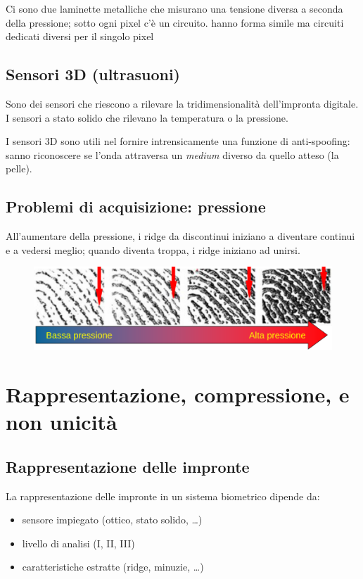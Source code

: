 \noindent Ci sono due laminette metalliche che misurano una tensione diversa a seconda
della pressione; sotto ogni pixel c'è un circuito.
hanno forma simile ma circuiti dedicati diversi per il singolo pixel

\subsection{Sensori 3D (ultrasuoni)}

Sono dei sensori che riescono a rilevare la tridimensionalità dell'impronta digitale.
I sensori a stato solido che rilevano la temperatura o la pressione.

\noindent I sensori 3D sono utili nel fornire intrensicamente una funzione di anti-spoofing: 
sanno riconoscere se l'onda attraversa un \textit{medium} diverso da quello atteso (la pelle).

\subsection{Problemi di acquisizione: pressione}

All'aumentare della pressione, i ridge da discontinui iniziano a diventare continui e a vedersi
meglio; quando diventa troppa, i ridge iniziano ad unirsi.
\begin{figure}[ht]
    \centering
    \includegraphics[width=0.75\linewidth]{chapters/images-chap5/pressione.png}
\end{figure}

\section{Rappresentazione, compressione,  e non unicità}

\subsection{Rappresentazione delle impronte}

La rappresentazione delle impronte in un sistema biometrico dipende da:
\begin{itemize}
    \item sensore impiegato (ottico, stato solido, \dots)
    \item livello di analisi (I, II, III)
    \item caratteristiche estratte (ridge, minuzie, \dots)
\end{itemize}

